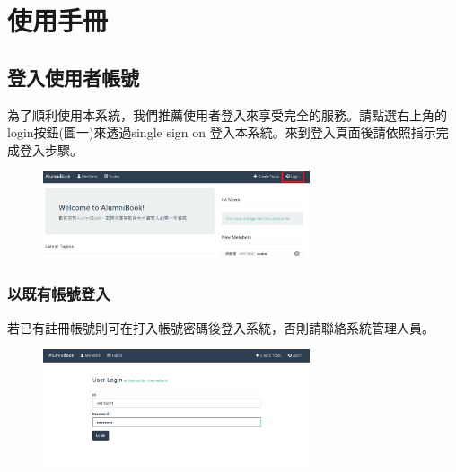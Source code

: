 \documentclass[12pt]{article}
\begin{document}
\section{使用手冊}

\subsection{登入使用者帳號}
為了順利使用本系統，我們推薦使用者登入來享受完全的服務。請點選右上角的login按鈕(圖一)來透過single sign on 登入本系統。來到登入頁面後請依照指示完成登入步驟。

\begin{figure}[H]
\centering\includegraphics[width=0.7\textwidth]{img/login01.png}
\end{figure}

\subsubsection{以既有帳號登入}
若已有註冊帳號則可在打入帳號密碼後登入系統，否則請聯絡系統管理人員。

\begin{figure}[H]
\centering\includegraphics[width=0.7\textwidth]{img/login03.png}
\end{figure}
\end{document}
